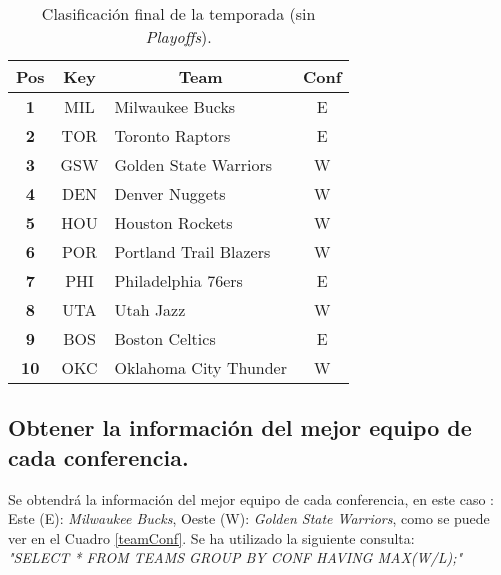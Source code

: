 \documentclass[11pt]{diazessay} %
\begin{document}
\begin{table}[!h]
	\centering
	\begin{tabular}{|c|c|l|c|}
		\hline
		\textbf{Pos} & \textbf{Key} & \multicolumn{1}{c|}{\textbf{Team}} & \textbf{Conf} \\ \hline
		\textbf{1}   & MIL          & Milwaukee Bucks                    & E             \\ \hline
		\textbf{2}   & TOR          & Toronto Raptors                    & E             \\ \hline
		\textbf{3}   & GSW          & Golden State Warriors              & W             \\ \hline
		\textbf{4}   & DEN          & Denver Nuggets                     & W             \\ \hline
		\textbf{5}   & HOU          & Houston Rockets                    & W             \\ \hline
		\textbf{6}   & POR          & Portland Trail Blazers             & W             \\ \hline
		\textbf{7}   & PHI          & Philadelphia 76ers                 & E             \\ \hline
		\textbf{8}   & UTA          & Utah Jazz                          & W             \\ \hline
		\textbf{9}   & BOS          & Boston Celtics                     & E             \\ \hline
		\textbf{10}  & OKC          & Oklahoma City Thunder              & W             \\ \hline
	\end{tabular}
	\caption{Clasificación final de la temporada (sin \textit{Playoffs}).}
	\label{qualy}
\end{table}
\newpage
\subsection*{Obtener la información del mejor equipo de cada conferencia.}
Se obtendrá la información del mejor equipo de cada conferencia, en este caso : Este (E): \textit{Milwaukee Bucks}, Oeste (W):
\textit{Golden State Warriors}, como se puede ver en el Cuadro \ref{teamConf}. 
Se ha utilizado la siguiente consulta:\\
 
\textit{"SELECT * FROM TEAMS GROUP BY CONF HAVING MAX(W/L);"}
\end{document}

